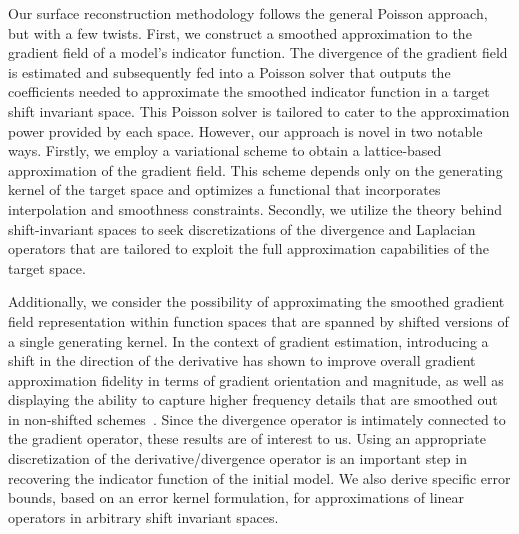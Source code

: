 Our surface reconstruction methodology follows the general Poisson approach, but with a few twists. First, we construct a smoothed approximation to the gradient field of a model's indicator function. The divergence of the gradient field is estimated and subsequently fed into a Poisson solver that outputs the coefficients needed to approximate the smoothed indicator function in a target shift invariant space. This Poisson solver is tailored to cater to the approximation power provided by each space. However, our approach is novel in two notable ways. Firstly, we employ a variational scheme to obtain a lattice-based approximation of the gradient field. This scheme depends only on the generating kernel of the target space and optimizes a functional that incorporates interpolation and smoothness constraints. Secondly, we utilize the theory behind shift-invariant spaces to seek discretizations of the divergence and Laplacian operators that are tailored to exploit the full approximation capabilities of the target space.

Additionally, we consider the possibility of approximating the smoothed gradient field representation within function spaces that are spanned by shifted versions of a single generating kernel. In the context of gradient estimation, introducing a shift in the direction of the derivative has shown to improve overall gradient approximation fidelity in terms of gradient orientation and magnitude, as well as displaying the ability to capture higher frequency details that are smoothed out in non-shifted schemes~\cite{gradrev}. Since the divergence operator is intimately connected to the gradient operator, these results are of interest to us. Using an appropriate discretization of the derivative/divergence operator is an important step in recovering the indicator function of the initial model. We also derive specific error bounds, based on an error kernel formulation, for approximations of linear operators in arbitrary shift invariant spaces.

